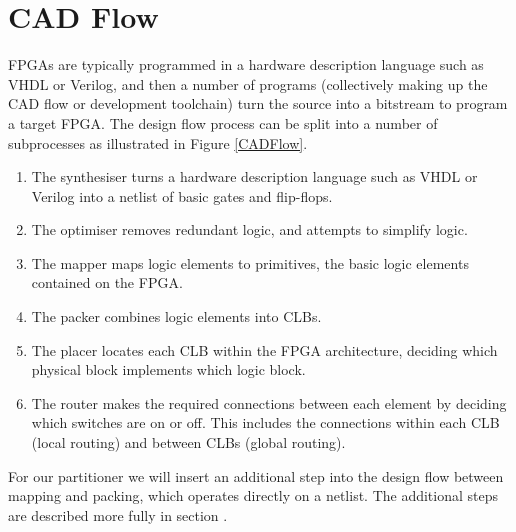 \documentclass[12pt,final,oneside]{dwThesis} %
\begin{document}
   \section{\gls{CAD} Flow}
   \glspl{FPGA} are typically programmed in a hardware description language such as \gls{VHDL} or Verilog, and then a number of programs (collectively making up the \gls{CAD} flow or development toolchain) turn the source into a bitstream to program a target \gls{FPGA}.
   The design flow process can be split into a number of subprocesses as illustrated in Figure \ref{CADFlow}\cite{VPRBook,VPRManual,FPGAArch}.
   \begin{enumerate}
      \item The synthesiser turns a hardware description language such as VHDL or Verilog into a netlist of basic gates and flip-flops.
      \item The optimiser removes redundant logic, and attempts to simplify logic.
      \item The mapper maps logic elements to \glspl{primitive}, the basic logic elements contained on the \gls{FPGA}.
      \item The packer combines logic elements into \glspl{CLB}.
      \item The placer locates each \gls{CLB} within the \gls{FPGA} architecture, deciding which physical block implements which logic block.
      \item The router makes the required connections between each element by deciding which switches are on or off. This includes the connections within each \gls{CLB} (local routing) and between \glspl{CLB} (global routing).
   \end{enumerate}
   For our partitioner we will insert an additional step into the design flow between mapping and packing, which operates directly on a netlist. The additional steps are described more fully in section .
\end{document}
